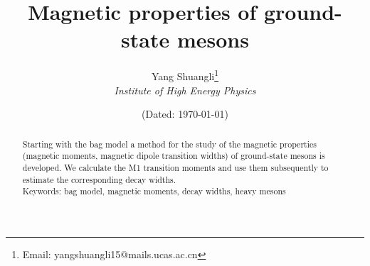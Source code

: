 \documentclass[12pt,epsf]{article}
\begin{document}
\title{\large \bf \vskip1.0cm Magnetic properties of ground-state mesons}
\author{\small Yang Shuangli\footnote{Email: yangshuangli15@mails.ucas.ac.cn}\\ \it \small Institute of High Energy Physics}
\date{(\small Dated: \small \today)}
\maketitle
\thispagestyle{empty}%

\vspace{-4.5pc}%
\begin{abstract}
Starting with the bag model a method for the study of the magnetic properties (magnetic moments, magnetic dipole transition widths) of ground-state mesons is developed. We calculate the M1 transition moments and use them subsequently to estimate the corresponding decay widths.
\\ \noindent Keywords: bag model, magnetic moments, decay widths, heavy mesons
\end{abstract}
\end{document}
